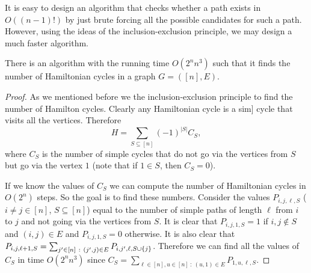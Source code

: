 It is easy to design an algorithm that checks whether a path exists in
$O((n - 1)!)$ by just brute forcing all the possible candidates for such a path.
However, using the ideas of the inclusion-exclusion principle, we may design
a much faster algorithm.
\begin{theorem}
  There is an algorithm with the running time $O(2^n n^3)$ such that it finds
  the number of Hamiltonian cycles in a graph $G = ([n], E)$.
\end{theorem}
\begin{proof}
  As we mentioned before we the inclusion-exclusion principle to find the number
  of Hamilton cycles. Clearly any Hamiltonian cycle is a sim] cycle that visits
  all the vertices. Therefore
  \[
    H = \sum_{S \subseteq [n]} (-1)^{|S|} C_S,
  \]
  where $C_S$ is the number of simple cycles that do not go via the vertices
  from $S$ but go via the vertex $1$ (note that if $1 \in S$, then $C_S = 0$).

  If we know the values of $C_S$ we can compute the number of Hamiltonian cycles
  in $O(2^n)$ steps. So the goal is to find these numbers.
  Consider the values $P_{i, j, \ell, S}$ ($i \neq j \in [n]$, $S \subseteq [n]$)
  equal to the number of simple paths of length $\ell$ from $i$ to $j$ and not
  going via the vertices from $S$. It is clear that $P_{i, j, 1, S} = 1$ if
  $i, j \notin S$ and $(i, j) \in E$ and $P_{i, j, 1, S} = 0$ otherwise.
  It is also clear that $P_{i, j, \ell + 1, S} =
  \sum_{j' \in [n] ~:~ (j', j) \in E} P_{i, j', \ell, S \cup \set{j}}$.
  Therefore we can find all the values of $C_S$ in time $O(2^n n^3)$ since
  $C_S = \sum_{\ell \in [n], u \in [n] ~:~ (u, 1) \in E} P_{1, u, \ell, S}$.
\end{proof}

